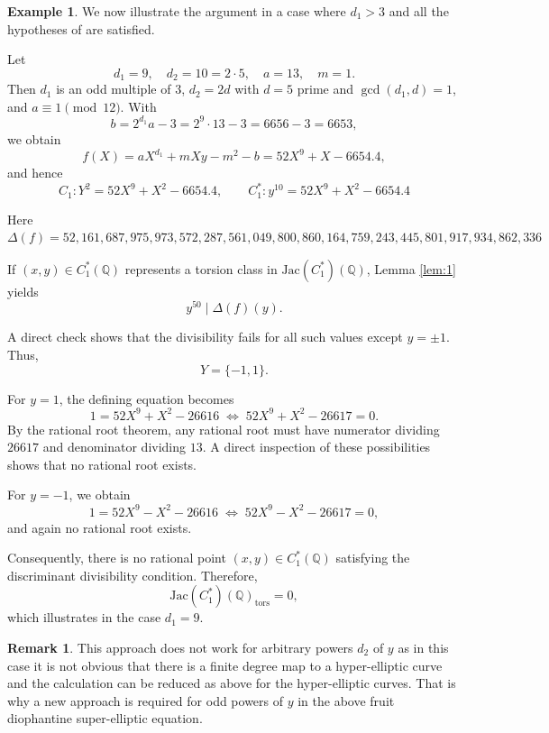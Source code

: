 \documentclass[12pt, reqno]{amsart}
\numberwithin{equation}{section}
\theoremstyle{definition}
\newtheorem{remark}[thm]{Remark}
\newtheorem{example}[thm]{Example}
\theoremstyle{nodefstyle}
\begin{document}
\begin{example}
We now illustrate the argument in a case where $d_1 > 3$ and all the hypotheses of  are satisfied.

Let
\[
d_1 = 9, \quad d_2 = 10 = 2 \cdot 5, \quad a = 13, \quad m = 1.
\]
Then $d_1$ is an odd multiple of $3$, $d_2 = 2d$ with $d = 5$ prime and $\gcd(d_1,d)=1$, and $a \equiv 1 \pmod{12}$. With
\[
b = 2^{d_1} a - 3 = 2^9 \cdot 13 - 3 = 6656 - 3 = 6653,
\]
we obtain
\[
f(X) = aX^{d_1} + mXy - m^2 - b = 52X^9 + X - 6654.4,
\]
and hence
\[
C_1 : Y^2 = 52X^9 + X^2 - 6654.4, \qquad C_1^* : y^{10} = 52X^9 + X^2 - 6654.4
\]

Here $\Delta(f)=52,161,687,975,973,572,287,561,049,800,860,164,759,243,445,801,917,934,862,336$

If $(x,y) \in C_1^*(\mathbb{Q})$ represents a torsion class in $\mathrm{Jac}(C_1^*)(\mathbb{Q})$, Lemma \autoref{lem:1} yields
\[
y^{50} \mid \Delta(f)(y).
\]


 A direct check shows that the divisibility fails for all such values except $y = \pm 1$. Thus,
\[
Y = \{-1,1\}.
\]

For $y = 1$, the defining equation becomes
\[
1 = 52X^9 + X^2 - 26616 \;\Longleftrightarrow\; 52X^9 + X^2 - 26617 = 0.
\]
By the rational root theorem, any rational root must have numerator dividing $26617$ and denominator dividing $13$. A direct inspection of these possibilities shows that no rational root exists.

For $y = -1$, we obtain
\[
1 = 52X^9 - X^2 - 26616 \;\Longleftrightarrow\; 52X^9 - X^2 - 26617 = 0,
\]
and again no rational root exists.

Consequently, there is no rational point $(x,y) \in C_1^*(\mathbb{Q})$ satisfying the discriminant divisibility condition. Therefore,
\[
\mathrm{Jac}(C_1^*)(\mathbb{Q})_{\mathrm{tors}} = 0,
\]
which illustrates  in the case $d_1 = 9$.
\end{example}
\begin{remark}
This approach does not work for arbitrary powers $d_2$ of $y$ as in this case it is not obvious that there is a finite degree map to a hyper-elliptic curve and the calculation can be reduced as above for the hyper-elliptic curves. That is why a new approach is required for odd powers of $y$ in the above fruit diophantine super-elliptic equation.
\end{remark}
\end{document}
